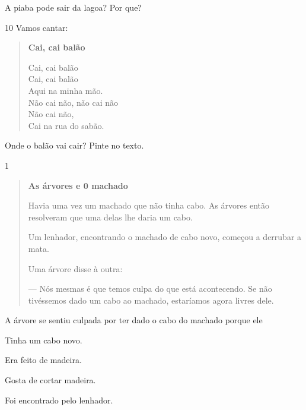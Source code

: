 
A piaba pode sair da lagoa? Por que?


\num{10} Vamos cantar:

\begin{verse}
\textbf{Cai, cai balão}

Cai, cai balão\\
Cai, cai balão\\
Aqui na minha mão.\\
Não cai não, não cai não\\
Não cai não,\\
Cai na rua do sabão.
\end{verse}


Onde o balão vai cair? Pinte no texto.


\num{1}

\begin{quote}
\textbf{As árvores e 0 machado}

Havia uma vez um machado que não tinha cabo.
As árvores então resolveram que uma delas lhe daria
um cabo.

Um lenhador, encontrando o machado de cabo novo,
começou a derrubar a mata.

Uma árvore disse à outra:

--- Nós mesmas é que temos culpa do que está
acontecendo. Se não tivéssemos dado um cabo ao machado,
estaríamos agora livres dele.
\end{quote}


A árvore se sentiu culpada por ter dado o cabo do machado porque ele

\begin{escolha}
\item Tinha um cabo novo.

\item Era feito de madeira.

\item Gosta de cortar madeira.

\item Foi encontrado pelo lenhador.
\end{escolha}

